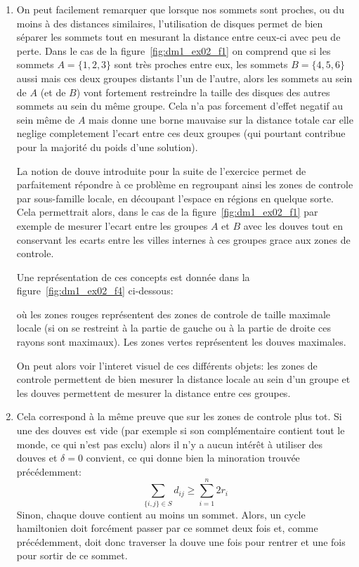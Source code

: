 {\begin{td-sol}[]
\begin{enumerate}
            \item On peut facilement remarquer que lorsque nos sommets sont proches, ou du moins à des distances similaires, l'utilisation de disques permet de bien séparer les sommets tout en mesurant la distance entre ceux-ci avec peu de perte.
            Dans le cas de la figure~\ref{fig:dm1_ex02_f1} on comprend que si les sommets \(A = \{1,2,3\}\) sont très proches entre eux, les sommets \(B = \{4, 5, 6\}\) aussi mais ces deux groupes distants l'un de l'autre, alors les sommets au sein de \(A\) (et de \(B\)) vont fortement restreindre la taille des disques des autres sommets au sein du même groupe.
            Cela n'a pas forcement d'effet negatif au sein même de \(A\) mais donne une borne mauvaise sur la distance totale car elle neglige completement l'ecart entre ces deux groupes (qui pourtant contribue pour la majorité du poids d'une solution).

            La notion de douve introduite pour la suite de l'exercice permet de parfaitement répondre à ce problème en regroupant ainsi les zones de controle par sous-famille locale, en découpant l'espace en régions en quelque sorte.
            Cela permettrait alors, dans le cas de la figure~\ref{fig:dm1_ex02_f1} par exemple de mesurer l'ecart entre les groupes \(A\) et \(B\) avec les douves tout en conservant les ecarts entre les villes internes à ces groupes grace aux zones de controle.

            Une représentation de ces concepts est donnée dans la figure~\ref{fig:dm1_ex02_f4} ci-dessous:

            

            où les zones rouges représentent des zones de controle de taille maximale locale (si on se restreint à la partie de gauche ou à la partie de droite ces rayons sont maximaux).
            Les zones vertes représentent les douves maximales.

            On peut alors voir l'interet visuel de ces différents objets: les zones de controle permettent de bien mesurer la distance locale au sein d'un groupe et les douves permettent de mesurer la distance entre ces groupes.

            \item Cela correspond à la même preuve que sur les zones de controle plus tot.
            Si une des douves est vide (par exemple si son complémentaire contient tout le monde, ce qui n'est pas exclu) alors il n'y a aucun intérêt à utiliser des douves et \(\delta=0\) convient, ce qui donne bien la minoration trouvée précédemment:
            \begin{equation*}
                \sum_{\{i, j\}\in S} d_{ij} \geq \sum_{i=1}^n 2 r_i
            \end{equation*}
            Sinon, chaque douve contient au moins un sommet.
            Alors, un cycle hamiltonien doit forcément passer par ce sommet deux fois et, comme précédemment, doit donc traverser la douve une fois pour rentrer et une fois pour sortir de ce sommet.
            

\end{enumerate}
\end{td-sol}}
